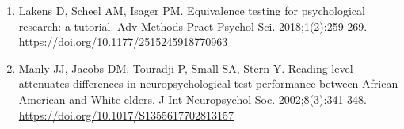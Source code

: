 \documentclass[12pt]{article}
\begin{document}
\begin{singlespace}
\begin{enumerate}
\item Lakens D, Scheel AM, Isager PM. Equivalence testing for psychological research: a tutorial. Adv Methods Pract Psychol Sci. 2018;1(2):259-269. \url{https://doi.org/10.1177/2515245918770963}

\item Manly JJ, Jacobs DM, Touradji P, Small SA, Stern Y. Reading level attenuates differences in neuropsychological test performance between African American and White elders. J Int Neuropsychol Soc. 2002;8(3):341-348. \url{https://doi.org/10.1017/S1355617702813157}

\end{enumerate}
\end{singlespace}
\end{document}
